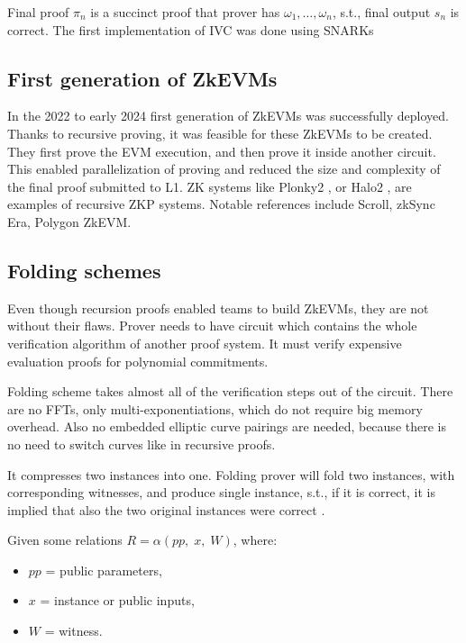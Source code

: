 Final proof $\pi_n$ is a succinct proof that prover has $\omega_1, \ldots, \omega_n$,
s.t., final output $s_n$ is correct. The first implementation of IVC was done
using SNARKs \cite{RecursiveSNARKsIVC}

\subsection{First generation of ZkEVMs}

In the 2022 to early 2024 first generation of ZkEVMs was successfully deployed.
Thanks to recursive proving, it was feasible for these ZkEVMs to be created.
They first prove the EVM execution, and then prove it inside another circuit.
This enabled parallelization of proving and reduced the size and complexity of
the final proof submitted to L1. ZK systems like Plonky2 \cite{Plonky2}, or
Halo2 \cite{Halo2}, are examples of recursive ZKP systems. Notable references
include Scroll, zkSync Era, Polygon ZkEVM.

\subsection{Folding schemes}

Even though recursion proofs enabled teams to build ZkEVMs, they are not without
their flaws. Prover needs to have circuit which contains the whole verification
algorithm of another proof system. It must verify expensive evaluation proofs
for polynomial commitments.

Folding scheme takes almost all of the verification steps out of the circuit.
There are no FFTs, only multi-exponentiations, which do not require big
memory overhead. Also no embedded elliptic curve pairings are needed, because
there is no need to switch curves like in recursive proofs.

It compresses two instances into one. Folding prover will fold two instances,
with corresponding witnesses, and produce single instance, s.t., if it is correct,
it is implied that also the two original instances were correct \cite{Nova}.

Given some relations $R = \alpha(pp,\;x,\;W)$, where:
\begin{itemize}
	\item $pp$ = public parameters,
	\item $x$ = instance or public inputs,
	\item $W$ = witness.
\end{itemize}

